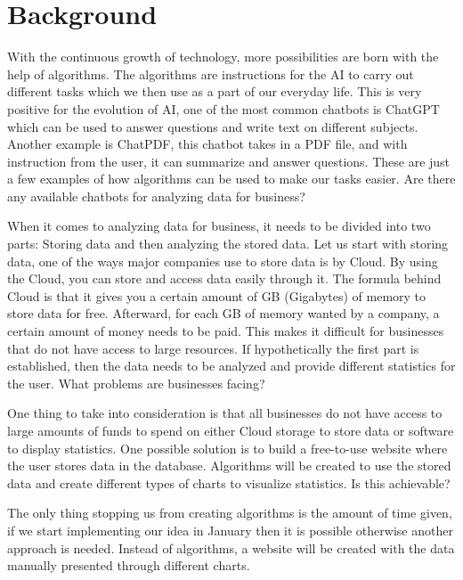 \section{Background}
With the continuous growth of technology, more possibilities are born with the help of algorithms. The algorithms are instructions for the AI to carry out different tasks which we then use as a part of our everyday life. This is very positive for the evolution of AI, one of the most common chatbots is ChatGPT which can be used to answer questions and write text on different subjects. Another example is ChatPDF, this chatbot takes in a PDF file, and with instruction from the user, it can summarize and answer questions. These are just a few examples of how algorithms can be used to make our tasks easier. Are there any available chatbots for analyzing data for business?

When it comes to analyzing data for business, it needs to be divided into two parts: Storing data and then analyzing the stored data. Let us start with storing data, one of the ways major companies use to store data is by Cloud. By using the Cloud, you can store and access data easily through it.  The formula behind Cloud is that it gives you a certain amount of GB (Gigabytes) of memory to store data for free. Afterward, for each GB of memory wanted by a company, a certain amount of money needs to be paid. This makes it difficult for businesses that do not have access to large resources. If hypothetically the first part is established, then the data needs to be analyzed and provide different statistics for the user. What problems are businesses facing?

One thing to take into consideration is that all businesses do not have access to large amounts of funds to spend on either Cloud storage to store data or software to display statistics. One possible solution is to build a free-to-use website where the user stores data in the database. Algorithms will be created to use the stored data and create different types of charts to visualize statistics. Is this achievable?

The only thing stopping us from creating algorithms is the amount of time given, if we start implementing our idea in January then it is possible otherwise another approach is needed. Instead of algorithms, a website will be created with the data manually presented through different charts.  

